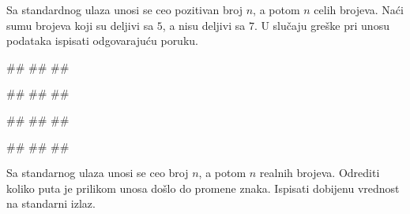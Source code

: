 \begin{Exercise}[label=p1.7_] 
Sa standardnog ulaza unosi se ceo pozitivan broj $n$, a potom $n$
celih brojeva.  Naći sumu brojeva koji su deljivi sa $5$, a nisu
deljivi sa $7$. U slučaju greške pri unosu podataka ispisati
odgovarajuću poruku.


\begin{miditest}
\begin{upotreba}{1}
#\naslovInt#
##
##
\end{upotreba}
\end{miditest}
\begin{miditest}
\begin{upotreba}{2}
#\naslovInt#
##
##
\end{upotreba}
\end{miditest}

\begin{miditest}
\begin{upotreba}{3}
#\naslovInt#
##
##
\end{upotreba}
\end{miditest}
\begin{miditest}
\begin{upotreba}{4}
#\naslovInt#
##
##
\end{upotreba}
\end{miditest}
\end{Exercise}
\begin{Answer}[ref=p1.7_]
\end{Answer}


\begin{Exercise}[label=p1.7_] 
Sa standarnog ulaza unosi se ceo broj $n$, a potom $n$ realnih
brojeva. Odrediti koliko puta je prilikom unosa došlo do promene
znaka. Ispisati dobijenu vrednost na standarni izlaz.\\ 
\end{Exercise}
\begin{Answer}[ref=p1.7_]
\end{Answer}


